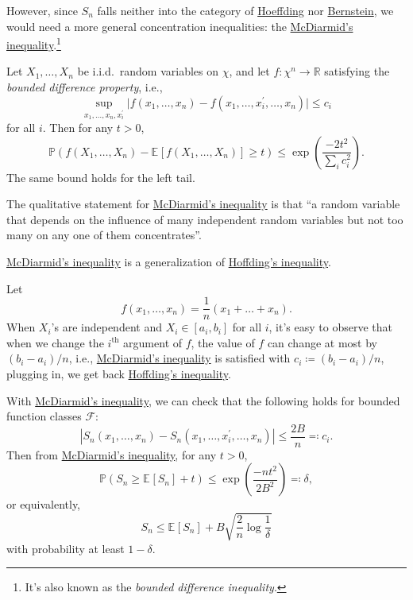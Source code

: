 However, since \(S_n\) falls neither into the category of \hyperref[thm:Hoeffding-inequality]{Hoeffding} nor \hyperref[thm:Bernstein-inequality]{Bernstein}, we would need a more general concentration inequalities: the \hyperref[thm:McDiarmid-inequality]{McDiarmid's inequality}.\footnote{It's also known as the \emph{bounded difference inequality}.}

\begin{theorem}\label{thm:McDiarmid-inequality}
	Let \(X_1, \dots , X_n\) be i.i.d.\ random variables on \(\chi \), and let \(f\colon \chi ^n \to \mathbb{R} \) satisfying the \emph{bounded difference property}, i.e.,
	\[
		\sup _{x_1, \dots , x_n, x_i^{\prime} }\vert f(x_1, \dots , x_n) - f(x_1, \dots , x_i^{\prime} , \dots , x_n) \vert \leq c_i
	\]
	for all \(i\). Then for any \(t > 0\),
	\[
		\mathbb{P} (f(X_1, \dots , X_n) - \mathbb{E}_{}\left[f (X_1, \dots , X_n)\right] \geq t) \leq \exp \left( \frac{-2t^2}{\sum_{i} c_i^2} \right).
	\]
	The same bound holds for the left tail.
\end{theorem}

\begin{remark}
	The qualitative statement for \hyperref[thm:McDiarmid-inequality]{McDiarmid's inequality} is that ``a random variable that depends on the influence of many independent random variables but not too many on any one of them concentrates''.
\end{remark}

\begin{remark}
	\hyperref[thm:McDiarmid-inequality]{McDiarmid's inequality} is a generalization of \hyperref[thm:Hoeffding-inequality]{Hoffding's inequality}.
\end{remark}
\begin{explanation}
	Let
	\[
		f(x_1, \dots , x_n) = \frac{1}{n}(x_1 + \dots + x_n).
	\]
	When \(X_i\)'s are independent and \(X_i \in [a_i, b_i]\) for all \(i\), it's easy to observe that when we change the \(i^{\text{th} }\) argument of \(f\), the value of \(f\) can change at most by \((b_i - a_i) / n\), i.e., \hyperref[thm:McDiarmid-inequality]{McDiarmid's inequality} is satisfied with \(c_i \coloneqq (b_i - a_i) / n\), plugging in, we get back \hyperref[thm:Hoeffding-inequality]{Hoffding's inequality}.
\end{explanation}

With \hyperref[thm:McDiarmid-inequality]{McDiarmid's inequality}, we can check that the following holds for bounded function classes \(\mathscr{F} \):
\[
	\left\vert S_n(x_1, \dots , x_n) - S_n(x_1, \dots , x_i^{\prime} , \dots , x_n) \right\vert \leq \frac{2B}{n} \eqqcolon c_i.
\]
Then from \hyperref[thm:McDiarmid-inequality]{McDiarmid's inequality}, for any \(t > 0\),
\[
	\mathbb{P} (S_n \geq \mathbb{E}_{}\left[S_n \right] + t) \leq \exp \left( \frac{-nt^2}{2B^2} \right) \eqqcolon \delta ,
\]
or equivalently,
\[
	S_n \leq \mathbb{E}_{}\left[S_n \right] + B \sqrt{\frac{2}{n}\log \frac{1}{\delta }}
\]
with probability at least \(1 - \delta \).


